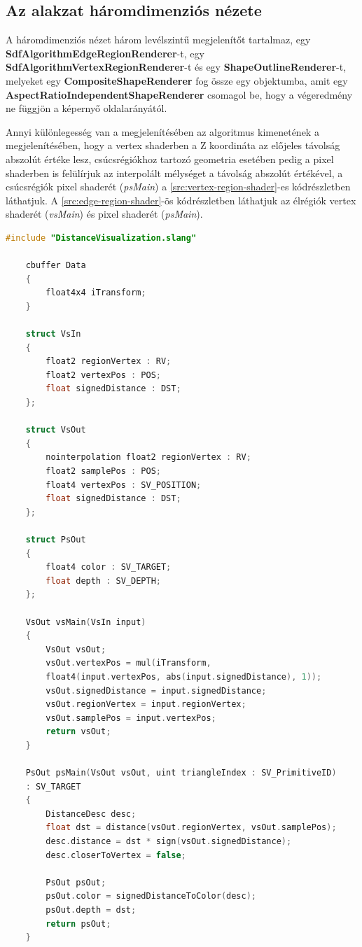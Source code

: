 \subsection{Az alakzat háromdimenziós nézete}

A háromdimenziós nézet három levélszintű megjelenítőt tartalmaz, egy \textbf{SdfAlgorithmEdgeRegionRenderer}-t, egy \textbf{SdfAlgorithmVertexRegionRenderer}-t és egy \textbf{ShapeOutlineRenderer}-t, melyeket egy \textbf{CompositeShapeRenderer} fog össze egy objektumba, amit egy \textbf{AspectRatioIndependentShapeRenderer} csomagol be, hogy a végeredmény ne függjön a képernyő oldalarányától.

Annyi különlegesség van a megjelenítésében az algoritmus kimenetének a megjelenítésében, hogy a vertex shaderben \cite{vertexshader} a Z koordináta az előjeles távolság abszolút értéke lesz, csúcsrégiókhoz tartozó geometria esetében pedig a pixel shaderben is felülírjuk az interpolált mélységet a távolság abszolút értékével, a csúcsrégiók pixel shaderét \cite{pixelshader} (\textit{psMain}) a \ref{src:vertex-region-shader}-es kódrészletben láthatjuk. A \ref{src:edge-region-shader}-ös kódrészletben láthatjuk az élrégiók vertex shaderét (\textit{vsMain}) és pixel shaderét (\textit{psMain}).

\begin{lstlisting}[language=c]
	#include "DistanceVisualization.slang"
	
	cbuffer Data
	{
		float4x4 iTransform;
	}
	
	struct VsIn
	{
		float2 regionVertex : RV;
		float2 vertexPos : POS;
		float signedDistance : DST;
	};
	
	struct VsOut
	{
		nointerpolation float2 regionVertex : RV;
		float2 samplePos : POS;
		float4 vertexPos : SV_POSITION;
		float signedDistance : DST;
	};
	
	struct PsOut
	{
		float4 color : SV_TARGET;
		float depth : SV_DEPTH;
	};
	
	VsOut vsMain(VsIn input)
	{
		VsOut vsOut;
		vsOut.vertexPos = mul(iTransform,
		float4(input.vertexPos, abs(input.signedDistance), 1));
		vsOut.signedDistance = input.signedDistance;
		vsOut.regionVertex = input.regionVertex;
		vsOut.samplePos = input.vertexPos;
		return vsOut;
	}
	
	PsOut psMain(VsOut vsOut, uint triangleIndex : SV_PrimitiveID)
	: SV_TARGET
	{
		DistanceDesc desc;
		float dst = distance(vsOut.regionVertex, vsOut.samplePos);
		desc.distance = dst * sign(vsOut.signedDistance);
		desc.closerToVertex = false;
		
		PsOut psOut;
		psOut.color = signedDistanceToColor(desc);
		psOut.depth = dst;
		return psOut;
	}
\end{lstlisting}


